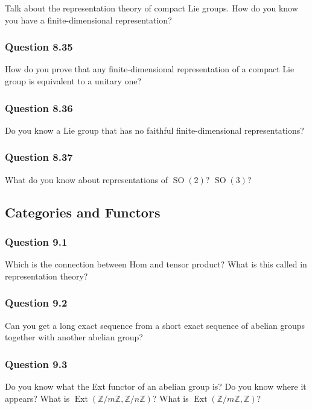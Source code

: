 Talk about the representation theory of compact Lie groups. How do you
know you have a finite-dimensional representation?

\hypertarget{question-8.35}{%
\subsubsection{Question 8.35}\label{question-8.35}}

How do you prove that any finite-dimensional representation of a compact
Lie group is equivalent to a unitary one?

\hypertarget{question-8.36}{%
\subsubsection{Question 8.36}\label{question-8.36}}

Do you know a Lie group that has no faithful finite-dimensional
representations?

\hypertarget{question-8.37}{%
\subsubsection{Question 8.37}\label{question-8.37}}

What do you know about representations of \({\operatorname{SO}}(2)\)?
\({\operatorname{SO}}(3)\)?

\hypertarget{categories-and-functors}{%
\subsection{Categories and Functors}\label{categories-and-functors}}

\hypertarget{question-9.1}{%
\subsubsection{Question 9.1}\label{question-9.1}}

Which is the connection between Hom and tensor product? What is this
called in representation theory?

\hypertarget{question-9.2}{%
\subsubsection{Question 9.2}\label{question-9.2}}

Can you get a long exact sequence from a short exact sequence of abelian
groups together with another abelian group?

\hypertarget{question-9.3}{%
\subsubsection{Question 9.3}\label{question-9.3}}

Do you know what the Ext functor of an abelian group is? Do you know
where it appears? What is
\(\operatorname{Ext} ({\mathbb{Z}}/m{\mathbb{Z}}, {\mathbb{Z}}/n{\mathbb{Z}})\)?
What is
\(\operatorname{Ext} ({\mathbb{Z}}/m{\mathbb{Z}}, {\mathbb{Z}})\)?



\newpage
\printbibliography[title=Bibliography]



